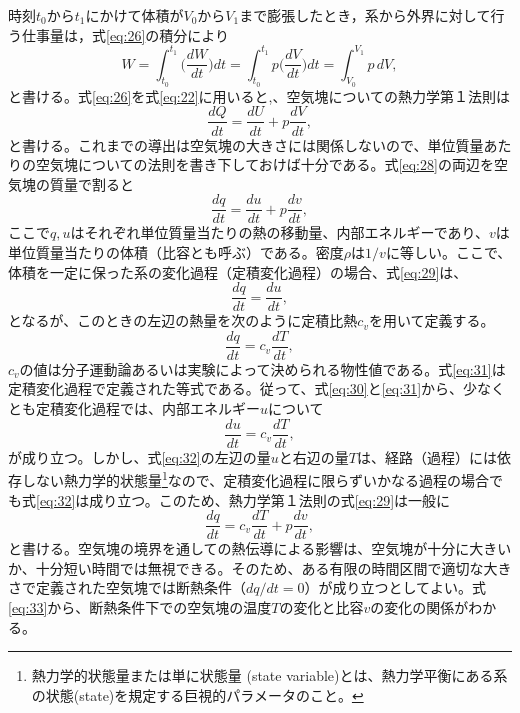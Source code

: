 \documentclass{ltjsarticle}
\begin{document}
時刻$t_{0}$から$t_{1}$にかけて体積が$V_{0}$から$V_{1}$まで膨張したとき，系から外界に対して行う仕事量は，式\eqref{eq:26}の積分により
\begin{equation}\label{eq:27}
 W=\int_{t_{0}}^{t_{1}}{\bigg (}\frac{dW}{dt}{\bigg )}dt=\int_{t_{0}}^{t_{1}}p{\bigg (}\frac{dV}{dt}{\bigg )}dt=\int_{V_{0}}^{V_{1}}p\,dV,
\end{equation}
と書ける。式\eqref{eq:26}を式\eqref{eq:22}に用いると,、空気塊についての熱力学第１法則は
\begin{equation}\label{eq:28}
 \frac{dQ}{dt}=\frac{dU}{dt}+p\frac{dV}{dt},
\end{equation}
と書ける。これまでの導出は空気塊の大きさには関係しないので、単位質量あたりの空気塊についての法則を書き下しておけば十分である。式\eqref{eq:28}の両辺を空気塊の質量で割ると
\begin{equation}\label{eq:29}
 \frac{dq}{dt}=\frac{du}{dt}+p\frac{dv}{dt},
\end{equation}
ここで$q, u$はそれぞれ単位質量当たりの熱の移動量、内部エネルギーであり、$v$は単位質量当たりの体積（比容とも呼ぶ）である。密度$\rho$は$1/v$に等しい。ここで、体積を一定に保った系の変化過程（定積変化過程）の場合、式\eqref{eq:29}は、
\begin{equation}\label{eq:30}
 \frac{dq}{dt}=\frac{du}{dt},
\end{equation}
となるが、このときの左辺の熱量を次のように定積比熱$c_{v}$を用いて定義する。
\begin{equation}\label{eq:31}
 \frac{dq}{dt}=c_{v}\frac{dT}{dt},
\end{equation}
$c_{v}$の値は分子運動論あるいは実験によって決められる物性値である。式\eqref{eq:31}は定積変化過程で定義された等式である。従って、式\eqref{eq:30}と\eqref{eq:31}から、少なくとも定積変化過程では、内部エネルギー$u$について
\begin{equation}\label{eq:32}
 \frac{du}{dt}=c_{v}\frac{dT}{dt},
\end{equation}
が成り立つ。しかし、式\eqref{eq:32}の左辺の量$u$と右辺の量$T$は、経路（過程）には依存しない熱力学的状態量\footnote{熱力学的状態量または単に状態量 (state variable)とは、熱力学平衡にある系の状態(state)を規定する巨視的パラメータのこと。}なので、定積変化過程に限らずいかなる過程の場合でも式\eqref{eq:32}は成り立つ。このため、熱力学第１法則の式\eqref{eq:29}は一般に
\begin{equation}\label{eq:33}
 \frac{dq}{dt}=c_{v}\frac{dT}{dt}+p\frac{dv}{dt},
\end{equation}
と書ける。空気塊の境界を通しての熱伝導による影響は、空気塊が十分に大きいか、十分短い時間では無視できる。そのため、ある有限の時間区間で適切な大きさで定義された空気塊では断熱条件（$dq/dt=0$）が成り立つとしてよい。式\eqref{eq:33}から、断熱条件下での空気塊の温度$T$の変化と比容$v$の変化の関係がわかる。
\end{document}
